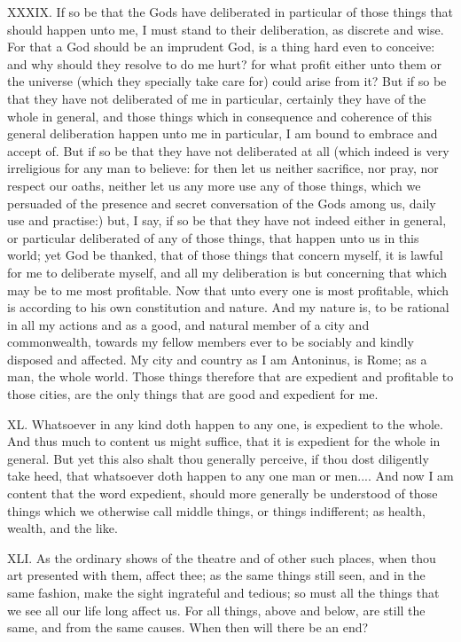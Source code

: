 XXXIX. If so be that the Gods have deliberated in particular of those
things that should happen unto me, I must stand to their deliberation, as
discrete and wise. For that a God should be an imprudent God, is a thing
hard even to conceive: and why should they resolve to do me hurt? for what
profit either unto them or the universe (which they specially take care
for) could arise from it? But if so be that they have not deliberated of
me in particular, certainly they have of the whole in general, and those
things which in consequence and coherence of this general deliberation
happen unto me in particular, I am bound to embrace and accept of. But if
so be that they have not deliberated at all (which indeed is very
irreligious for any man to believe: for then let us neither sacrifice, nor
pray, nor respect our oaths, neither let us any more use any of those
things, which we persuaded of the presence and secret conversation of the
Gods among us, daily use and practise:) but, I say, if so be that they
have not indeed either in general, or particular deliberated of any of
those things, that happen unto us in this world; yet God be thanked, that
of those things that concern myself, it is lawful for me to deliberate
myself, and all my deliberation is but concerning that which may be to me
most profitable. Now that unto every one is most profitable, which is
according to his own constitution and nature. And my nature is, to be
rational in all my actions and as a good, and natural member of a city and
commonwealth, towards my fellow members ever to be sociably and kindly
disposed and affected. My city and country as I am Antoninus, is Rome; as
a man, the whole world. Those things therefore that are expedient and
profitable to those cities, are the only things that are good and
expedient for me.

XL. Whatsoever in any kind doth happen to any one, is expedient to the
whole. And thus much to content us might suffice, that it is expedient for
the whole in general. But yet this also shalt thou generally perceive, if
thou dost diligently take heed, that whatsoever doth happen to any one man
or men.... And now I am content that the word expedient, should more
generally be understood of those things which we otherwise call middle
things, or things indifferent; as health, wealth, and the like.

XLI. As the ordinary shows of the theatre and of other such places,
when thou art presented with them, affect thee; as the same things still
seen, and in the same fashion, make the sight ingrateful and tedious; so
must all the things that we see all our life long affect us. For all
things, above and below, are still the same, and from the same causes.
When then will there be an end?

